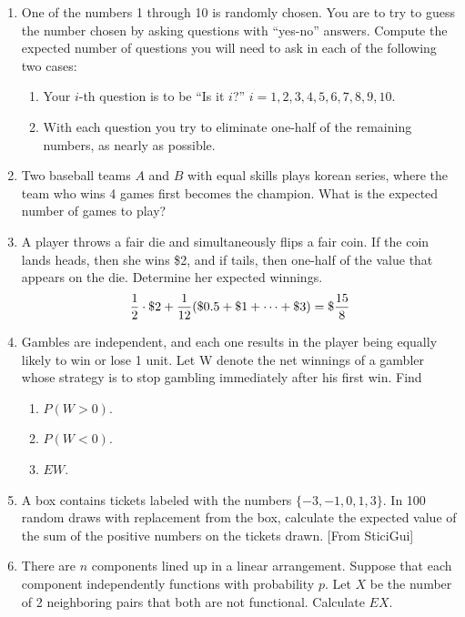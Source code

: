 \documentclass[12pt]{article}%
\newcommand{\0}{{\bf 0}}
\begin{document}
\begin{enumerate}
\item
One of the numbers 1 through 10 is randomly chosen. You are to try to guess the number chosen by asking questions with ``yes-no'' answers. Compute the expected number of questions you will need to ask in each of the following two cases:
\begin{enumerate}
\item Your $i$-th question is to be ``Is it $i$?'' $i = 1, 2, 3, 4, 5, 6, 7, 8, 9, 10$.

\item With each question you try to eliminate one-half of the remaining numbers, as nearly as possible.

\end{enumerate}



\item
Two baseball teams $A$ and $B$ with equal skills plays korean series,
where the team who wins 4 games first becomes the champion. 
What is the expected number of games to play?

\item
A player throws a fair die and simultaneously flips a fair coin. 
If the coin lands heads, then she wins \$2, and if tails, then one-half of the value that appears on the die. Determine her expected winnings.
\\
{\color{blue}{\bf Sol.}}
$$\frac{1}{2}\cdot \$2 +\frac{1}{12}(\$0.5+\$ 1+\cdots+\$3)=\$ \frac{15}{8}$$


\item
Gambles are independent, and each one results in
the player being equally likely to win or lose 1 unit. Let W denote the net winnings of a gambler whose strategy is to stop gambling immediately after his first win. Find
\begin{enumerate}
\item $P(W>0)$. 

\item $P(W<0)$.

\item $EW$.
\end{enumerate}

\item
A box contains tickets labeled with the numbers $\{-3, -1, 0, 1, 3\}$. 
In 100 random draws with replacement from the box, 
calculate the expected value of the sum of the positive numbers on the tickets drawn.
 [From SticiGui]


\item
There are $n$ components lined up in a linear arrangement. 
Suppose that each component independently functions with probability $p$. 
Let $X$ be the number of 2 neighboring pairs that both are not functional. 
Calculate $EX$. 





\end{enumerate}
\end{document}
